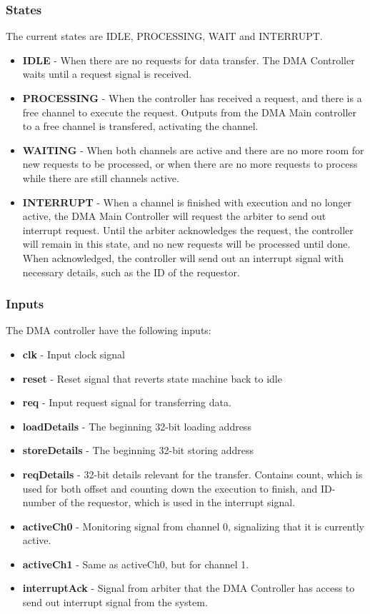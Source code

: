 \subsubsection{States}
The current states are IDLE, PROCESSING, WAIT and INTERRUPT.

\begin{itemize}
    \item \textbf{IDLE} - When there are no requests for data transfer.
    The DMA Controller waits until a request signal is received.
    \item \textbf{PROCESSING} - When the controller has received a request, and there is a free channel to execute the request.
    Outputs from the DMA Main controller to a free channel is transfered, activating the channel.
    \item \textbf{WAITING} - When both channels are active and there are no more room for new requests to be processed, or when there are no more requests to process while there are still channels active.
    \item \textbf{INTERRUPT} - When a channel is finished with execution and no longer active, the DMA Main Controller will request the arbiter to send out interrupt request.
    Until the arbiter acknowledges the request, the controller will remain in this state, and no new requests will be processed until done.
    When acknowledged, the controller will send out an interrupt signal with necessary details, such as the ID of the requestor.  
\end{itemize}

\subsubsection{Inputs}
The DMA controller have the following inputs:

\begin{itemize}
    \item \textbf{clk} - Input clock signal
    \item \textbf{reset} - Reset signal that reverts state machine back to idle
    \item \textbf{req} - Input request signal for transferring data.
    \item \textbf{loadDetails} - The beginning 32-bit loading address
    \item \textbf{storeDetails} - The beginning 32-bit storing address
    \item \textbf{reqDetails} - 32-bit details relevant for the transfer.
    Contains count, which is used for both offset and counting down the execution to finish, and ID-number of the requestor, which is used in the interrupt signal.
    \item \textbf{activeCh0} - Monitoring signal from channel 0, signalizing that it is currently active.
    \item \textbf{activeCh1} - Same as activeCh0, but for channel 1.
    \item \textbf{interruptAck} - Signal from arbiter that the DMA Controller has access to send out interrupt signal from the system.
\end{itemize}

